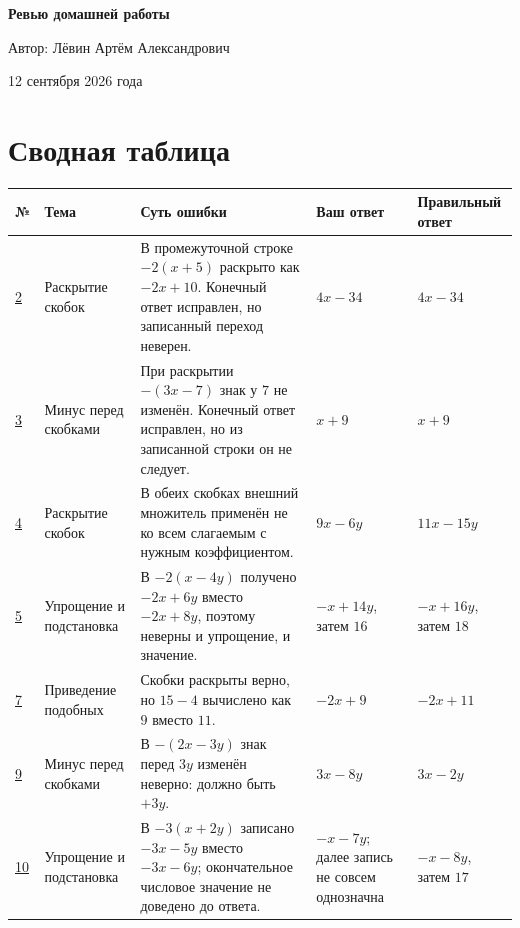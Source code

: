 \documentclass[12pt,a4paper]{article}
\begin{document}
\begin{titlepage}
\centering
\vspace*{0.18\textheight}
{\LARGE\bfseries Ревью домашней работы\par}
\vspace{18mm}
{\large Автор: Лёвин Артём Александрович\par}
\vspace{6mm}
{\large 12 сентября 2026 года\par}
\vfill
{}
\end{titlepage}

\newpage
\section*{Сводная таблица}
\small
\begin{longtable}{|p{0.8cm}|p{2.7cm}|p{4.5cm}|p{2.5cm}|p{2.6cm}|}
\hline
\textbf{№} & \textbf{Тема} & \textbf{Суть ошибки} & \textbf{Ваш ответ} & \textbf{Правильный ответ} \\
\hline
\hyperref[task:2]{2} & Раскрытие скобок & В промежуточной строке $-2(x+5)$ раскрыто как $-2x+10$. Конечный ответ исправлен, но записанный переход неверен. & $4x-34$ & $4x-34$ \\
\hline
\hyperref[task:3]{3} & Минус перед скобками & При раскрытии $-(3x-7)$ знак у $7$ не изменён. Конечный ответ исправлен, но из записанной строки он не следует. & $x+9$ & $x+9$ \\
\hline
\hyperref[task:4]{4} & Раскрытие скобок & В обеих скобках внешний множитель применён не ко всем слагаемым с нужным коэффициентом. & $9x-6y$ & $11x-15y$ \\
\hline
\hyperref[task:5]{5} & Упрощение и подстановка & В $-2(x-4y)$ получено $-2x+6y$ вместо $-2x+8y$, поэтому неверны и упрощение, и значение. & $-x+14y$, затем $16$ & $-x+16y$, затем $18$ \\
\hline
\hyperref[task:7]{7} & Приведение подобных & Скобки раскрыты верно, но $15-4$ вычислено как $9$ вместо $11$. & $-2x+9$ & $-2x+11$ \\
\hline
\hyperref[task:9]{9} & Минус перед скобками & В $-(2x-3y)$ знак перед $3y$ изменён неверно: должно быть $+3y$. & $3x-8y$ & $3x-2y$ \\
\hline
\hyperref[task:10]{10} & Упрощение и подстановка & В $-3(x+2y)$ записано $-3x-5y$ вместо $-3x-6y$; окончательное числовое значение не доведено до ответа. & $-x-7y$; далее запись не совсем однозначна & $-x-8y$, затем $17$ \\
\hline
\end{longtable}
\normalsize
\end{document}
